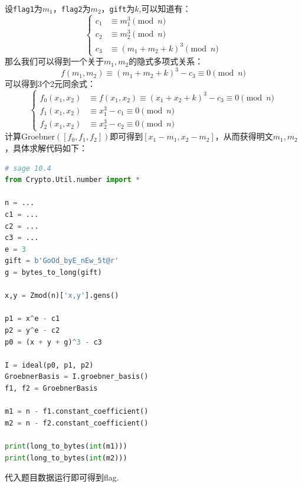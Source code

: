 \documentclass{book}
\numberwithin{equation}{subsubsection}
\begin{document}
设\texttt{flag1}为$m_1$，\texttt{flag2}为$m_2$，\texttt{gift}为$k$,可以知道有：
\begin{equation}
    \begin{cases}
        c_1&\equiv m_1^3\pmod{n}\\
        c_2&\equiv m_2^3\pmod{n}\\
        c_3&\equiv (m_1+m_2+k)^3\pmod{n}
    \end{cases}
    \nonumber
\end{equation}
那么我们可以得到一个关于$m_1,m_2$的隐式多项式关系：
\begin{equation}
    f(m_1,m_2)\equiv (m_1+m_2+k)^3-c_3\equiv 0\pmod{n}
    \nonumber
\end{equation}
可以得到3个2元同余式：
\begin{equation}
    \begin{cases}
        f_0(x_1,x_2)&\equiv f(x_1,x_2)\equiv (x_1+x_2+k)^3-c_3\equiv 0\pmod{n}\\
        f_1(x_1,x_2)&\equiv x_1^3-c_1\equiv 0\pmod{n}\\
        f_2(x_1,x_2)&\equiv x_2^3-c_2\equiv 0\pmod{n}
    \end{cases}
    \nonumber
\end{equation}
计算$\text{Groebner}([f_0,f_1,f_2])$即可得到$[x_1-m_1,x_2-m_2]$，从而获得明文$m_1,m_2$，具体求解代码如下：
\begin{lstlisting}[language=Python,basicstyle=\ttfamily,breaklines=true,keywordstyle=\bfseries\color{blue}]
# sage 10.4
from Crypto.Util.number import *

n = ...
c1 = ...
c2 = ...
c3 = ...
e = 3
gift = b'GoOd_byE_nEw_5t@r'
g = bytes_to_long(gift)

x,y = Zmod(n)['x,y'].gens()

p1 = x^e - c1
p2 = y^e - c2
p0 = (x + y + g)^3 - c3

I = ideal(p0, p1, p2)
GroebnerBasis = I.groebner_basis()
f1, f2 = GroebnerBasis

m1 = n - f1.constant_coefficient()
m2 = n - f2.constant_coefficient()

print(long_to_bytes(int(m1)))
print(long_to_bytes(int(m2)))
\end{lstlisting}
代入题目数据运行即可得到flag.\par
\end{document}
